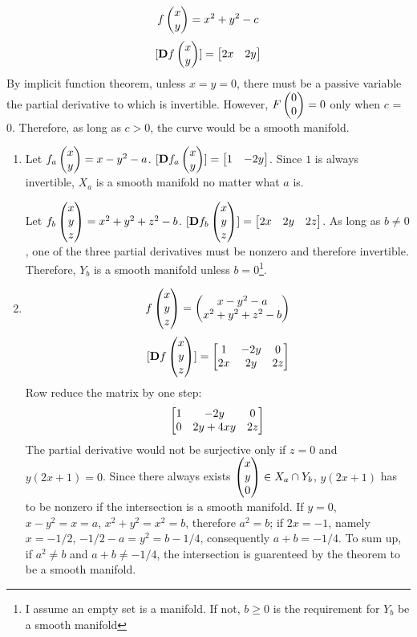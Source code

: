 \documentclass{homework}
\begin{document}
\begin{problem}{6}
$$f\begin{pmatrix}x\\y\end{pmatrix} = x^2 + y^2 -c$$
$$[\mathbf{D}f\begin{pmatrix}x\\y\end{pmatrix}] = \begin{bmatrix}2x&2y\end{bmatrix}$$
By implicit function theorem, unless $x = y = 0$, there must be a passive variable the partial derivative to which is invertible. However, $F\begin{pmatrix}0\\0\end{pmatrix} = 0$ only when $c$ = 0. Therefore, as long as $c > 0$, the curve would be a smooth manifold.
\end{problem}

\begin{problem}{7}
\begin{enumerate}
\item
Let $f_a\begin{pmatrix}x\\y\end{pmatrix} = x-y^2 - a$. $[\mathbf{D}f_a\begin{pmatrix}x\\y\end{pmatrix}] = \begin{bmatrix}1&-2y\end{bmatrix}$. Since $1$ is always invertible, $X_a$ is a smooth manifold no matter what $a$ is.

Let $f_b\begin{pmatrix}x\\y\\z\end{pmatrix} = x^2+y^2+z^2-b$. $[\mathbf{D}f_b\begin{pmatrix}x\\y\\z\end{pmatrix}] = \begin{bmatrix}2x&2y&2z\end{bmatrix}$. As long as $b \neq 0$, one of the three partial derivatives must be nonzero and therefore invertible. Therefore, $Y_b$ is a smooth manifold unless $b = 0$\footnote{I assume an empty set is a manifold. If not, $b \ge 0$ is the requirement for $Y_b$ be a smooth manifold}.
\item
$$f\begin{pmatrix}x\\y\\z\end{pmatrix} = \begin{pmatrix}x-y^2-a\\x^2+y^2+z^2-b\end{pmatrix}$$
$$[\mathbf{D}f\begin{pmatrix}x\\y\\z\end{pmatrix}] = \begin{bmatrix}1&-2y&0\\2x&2y&2z\end{bmatrix}$$
Row reduce the matrix by one step:
$$\begin{bmatrix}1&-2y&0\\0&2y+4xy&2z\end{bmatrix}$$
The partial derivative would not be surjective only if $z = 0$ and $y(2x+1) = 0$. Since there always exists $\begin{pmatrix}x\\y\\0\end{pmatrix} \in X_a \cap Y_b$, $y(2x+1)$ has to be nonzero if the intersection is a smooth manifold. If $y = 0$, $x-y^2=x=a$, $x^2+y^2=x^2=b$, therefore $a^2=b$; if $2x=-1$, namely $x=-1/2$, $-1/2-a=y^2=b-1/4$, consequently $a+b=-1/4$. To sum up, if $a^2 \neq b$ and $a + b \neq -1/4$, the intersection is guarenteed by the theorem to be a smooth manifold.
\end{enumerate}
\end{problem}
\end{document}
